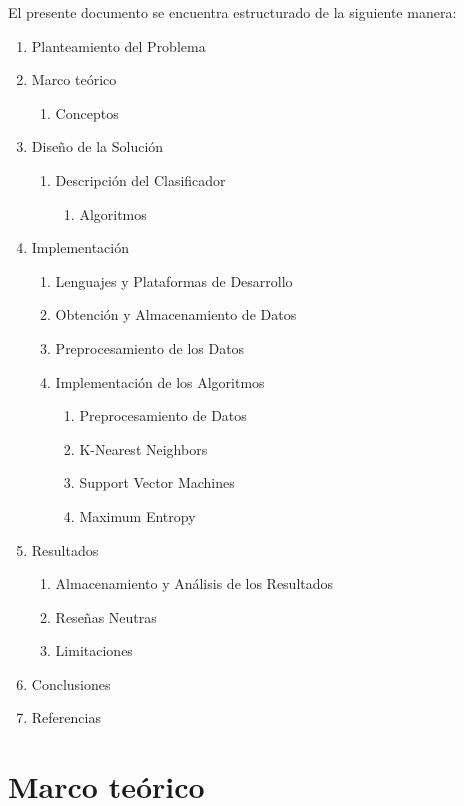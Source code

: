\documentclass[hidelinks]{sig-alternate-05-2015}
\begin{document}
El presente documento se encuentra estructurado de la siguiente manera:
\begin{enumerate}

	\item Planteamiento del Problema
	\item Marco teórico
	\begin{enumerate}
		\item Conceptos
	\end{enumerate}
    \item Diseño de la Solución
    \begin{enumerate}
		\item Descripción del Clasificador
        \begin{enumerate}
            \item Algoritmos
		\end{enumerate}
	\end{enumerate}
    \item Implementación
    \begin{enumerate}
		\item Lenguajes y Plataformas de Desarrollo
		\item Obtención y Almacenamiento de Datos
        \item Preprocesamiento de los Datos
        \item Implementación de los Algoritmos
		\begin{enumerate}
			\item Preprocesamiento de Datos
			\item K-Nearest Neighbors
        	\item Support Vector Machines
            \item Maximum Entropy
	\end{enumerate}
	\end{enumerate}
    \item Resultados
    \begin{enumerate}
		\item Almacenamiento y Análisis de los Resultados
		\item Reseñas Neutras
        \item Limitaciones
	\end{enumerate}
    \item Conclusiones
    \item Referencias
    
\end{enumerate}
\section{Marco teórico}
\end{document}
